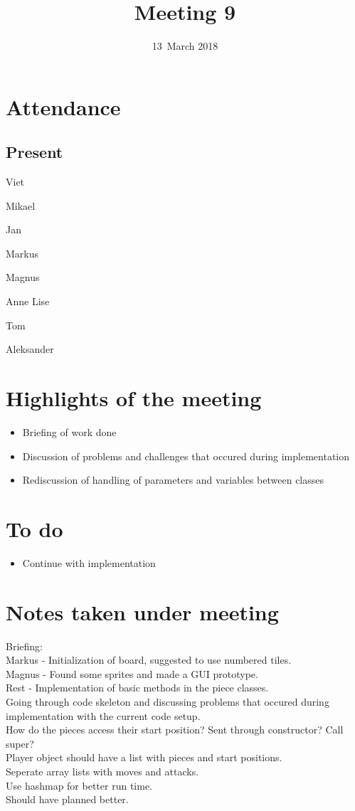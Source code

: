 \documentclass[letterpaper,11pt]{article}
\title{Meeting 9}
\date{13~March 2018}
\begin{document}
\maketitle
\section*{Attendance}
\subsection*{Present}
\begin{list}{}{}
	\item Viet
	\item Mikael
	\item Jan
	\item Markus
	\item Magnus
	\item Anne Lise
	\item Tom
	\item Aleksander
\end{list}

\newpage
\section*{Highlights of the meeting}
\begin{itemize}
	\item Briefing of work done
	\item Discussion of problems and challenges that occured during implementation
	\item Rediscussion of handling of parameters and variables between classes
\end{itemize}

\section*{To do}
\begin{itemize}
	\item Continue with implementation
\end{itemize}

\section*{Notes taken under meeting}
Briefing: \\
Markus - Initialization of board, suggested to use numbered tiles. \\
Magnus - Found some sprites and made a GUI prototype. \\
Rest - Implementation of basic methods in the piece classes. \\
Going through code skeleton and discussing problems that occured during implementation with the current code setup. \\
How do the pieces access their start position? Sent through constructor? Call super? \\
Player object should have a list with pieces and start positions. \\
Seperate array lists with moves and attacks. \\
Use hashmap for better run time. \\
Should have planned better. \\
\end{document}
